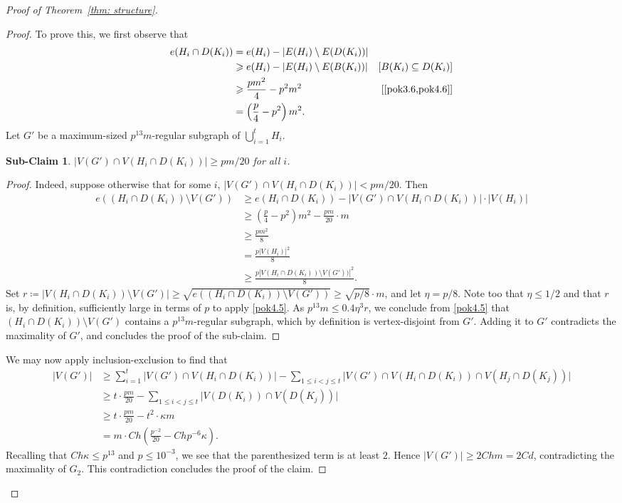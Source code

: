 \documentclass[10pt]{article}
\newtheorem{subclaim}[theorem]{Sub-Claim}
\theoremstyle{definition}
\newcommand\ab[1]{\lvert#1\rvert}
\let\leq\leqslant
\let\geq\geqslant
\begin{document}
\begin{proof}[Proof of Theorem~\ref{thm: structure}]
\begin{proof}
To prove this, we first observe that
\begin{align*}
    e(H_i\cap D(K_i))&=e(H_i)-\ab{E(H_i) \setminus E(D(K_i))}\\
    &\geq e(H_i)-\ab{E(H_i) \setminus E(B(K_i))} &[B(K_i)\subseteq D(K_i)]\\
    &\geq \frac{pm^2}{4} - p^2 m^2 &[\text{\cref{pok3.6,pok4.6}}]\\
    &=\left(\frac p4 - p^2\right) m^2.
\end{align*}
Let $G'$ be a maximum-sized $p^{13}m$-regular subgraph of $\bigcup_{i=1}^{t} H_i$.
\begin{subclaim}
    $|V(G')\cap V(H_i\cap D(K_i))|\geq pm/20$ for all $i$. 
\end{subclaim}
\begin{proof}
Indeed, suppose otherwise that for some $i$, $|V(G')\cap V(H_i\cap D(K_i))|< pm/20$. 
Then 
\begin{align*}
    e((H_i\cap D(K_i))\setminus V(G'))&\geq e(H_i\cap D(K_i))-|V(G')\cap V(H_i\cap D(K_i))|\cdot|V(H_i)|\\
    &\geq \left(\frac p4-p^2\right)m^2-\frac{pm}{20}\cdot m\\
    &\geq \frac{pm^2}8\\
    &=\frac{p|V(H_i)|^2} 8\\
    &\geq \frac{p|V(H_i\cap D(K_i))\setminus V(G'))|^2}8.
\end{align*}
Set $r \coloneqq |V(H_i\cap D(K_i))\setminus V(G')|\geq \sqrt{e((H_i\cap D(K_i))\setminus V(G'))}\geq \sqrt{p/8}\cdot m$, and let $\eta=p/8$. Note too that $\eta \leq 1/2$ and that $r$ is, by definition, sufficiently large in terms of $p$ to apply \cref{pok4.5}. As $p^{13}m \leq 0.4 \eta^3 r$, we conclude from \cref{pok4.5} that 
$(H_i\cap D(K_i))\setminus V(G')$ contains a $p^{13}m$-regular subgraph, which by definition is vertex-disjoint from $G'$. Adding it to $G'$ contradicts the maximality of $G'$, and concludes the proof of the sub-claim.
\end{proof}
We may now apply inclusion-exclusion to find that
\begin{align*}
    \ab{V(G')} &\geq \sum_{i=1}^t \ab{V(G')\cap V(H_i \cap D(K_i))} - \sum_{1 \leq i<j\leq t} \ab{V(G') \cap V(H_i \cap D(K_i)) \cap V(H_j \cap D(K_j))}\\
    &\geq t \cdot \frac{pm}{20} - \sum_{1 \leq i<j\leq t} \ab{V(D(K_i)) \cap V(D(K_j))}\\
    &\geq t\cdot\frac{pm}{20}-t^2\cdot \kappa m\\
    &=m \cdot Ch\left(\frac{p^{-2}}{20} - Ch p^{-6}\kappa \right).
\end{align*}
Recalling that $Ch\kappa \leq p^{13}$ and $p \leq 10^{-3}$, we see that the parenthesized term is at least $2$. Hence $\ab{V(G')}\geq 2Chm = 2Cd$, contradicting the maximality of $G_2$. This contradiction concludes the proof of the claim. 
\end{proof}




\end{proof}
\end{document}
